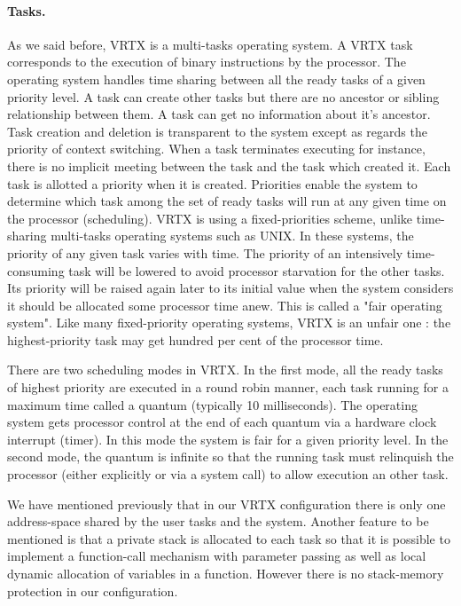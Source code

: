 \documentclass[10pt]{report}
\begin{document}
\paragraph{Tasks.} As we said before, VRTX is a multi-tasks operating system. A VRTX
task corresponds to the execution of binary instructions by the
processor. The operating system handles time sharing between all
the ready tasks of a given priority level. A task can create other tasks
but there are no ancestor or sibling relationship between them. A
task can get no information about it's ancestor. Task creation
and deletion is transparent to the system except as regards the priority  of 
context switching. When a task terminates executing for instance, there is no implicit meeting 
between the task and the task which created it.
Each task is allotted a priority when it is created. Priorities enable
the system to determine which task among the set of ready tasks
will run at any given time on the processor (scheduling). VRTX is
using a fixed-priorities scheme, unlike time-sharing multi-tasks
operating systems such as UNIX. In these systems, the priority of
any given task varies with time. The priority of an intensively time-consuming
task will be lowered to avoid processor starvation for
the other tasks. Its priority will be raised again later to its
initial value when the system considers it should be allocated 
some processor time anew. This is called a "fair operating system".
Like many fixed-priority operating systems, VRTX is an unfair
one : the highest-priority task may get hundred per cent of the 
processor time.

There are two scheduling modes in VRTX. In the first mode, all
the ready tasks of highest priority are executed in a round robin
manner, each task running for a maximum time called a quantum
(typically 10 milliseconds). The operating system gets processor
control at the end of each quantum via a hardware clock interrupt
(timer). In this mode the system is fair for a given priority
level. In the second mode, the quantum is infinite so that the
running task must relinquish the processor (either explicitly or
via a system call) to allow execution an other task.

We have mentioned previously that in our VRTX configuration there
is only one address-space shared by the user tasks and the system. 
Another feature to be mentioned is that a private stack is
allocated to each task so that it is possible to implement a
function-call mechanism with parameter passing as well as local dynamic
allocation of variables in a function. However there is no
stack-memory protection in our configuration.
\end{document}
